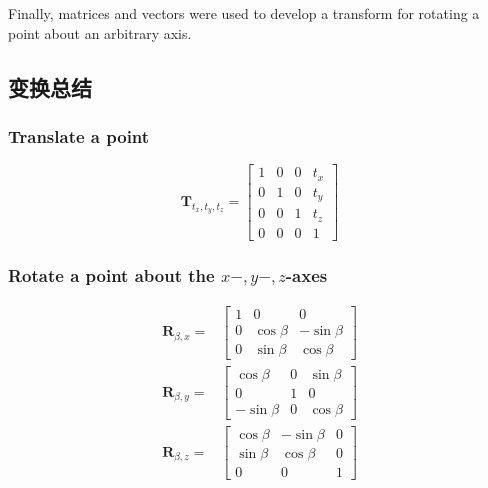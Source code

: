 Finally, matrices and vectors were used to develop a transform for rotating a point about an arbitrary axis.

\subsection{变换总结}
\subsubsection*{Translate a point}
$$
\mathbf{T}_{t_{x}, t_{y}, t_{z}}=\left[\begin{array}{cccc}
1 & 0 & 0 & t_{x} \\
0 & 1 & 0 & t_{y} \\
0 & 0 & 1 & t_{z} \\
0 & 0 & 0 & 1
\end{array}\right]
$$

\subsubsection*{Rotate a point about the $x-, y-, z$-axes}
$$
\begin{aligned}
\mathbf{R}_{\beta, x}= & {\left[\begin{array}{ccc}
1 & 0 & 0 \\
0 & \cos \beta & -\sin \beta \\
0 & \sin \beta & \cos \beta
\end{array}\right] } \\
\mathbf{R}_{\beta, y}= & {\left[\begin{array}{ccc}
\cos \beta & 0 & \sin \beta \\
0 & 1 & 0 \\
-\sin \beta & 0 & \cos \beta
\end{array}\right] } \\
\mathbf{R}_{\beta, z}= & {\left[\begin{array}{ccc}
\cos \beta & -\sin \beta & 0 \\
\sin \beta & \cos \beta & 0 \\
0 & 0 & 1
\end{array}\right] }
\end{aligned}
$$

